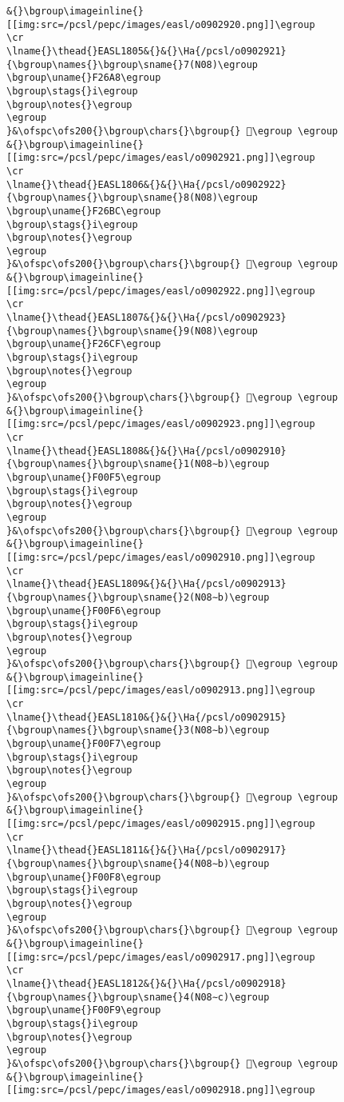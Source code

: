 \begin{verbatim}
&{}\bgroup\imageinline{}[[img:src=/pcsl/pepc/images/easl/o0902920.png]]\egroup
\cr
\lname{}\thead{}EASL1805&{}&{}\Ha{/pcsl/o0902921}{\bgroup\names{}\bgroup\sname{}7(N08)\egroup
\bgroup\uname{}F26A8\egroup
\bgroup\stags{}i\egroup
\bgroup\notes{}\egroup
\egroup
}&\ofspc\ofs200{}\bgroup\chars{}\bgroup{} 󲚨\egroup \egroup
&{}\bgroup\imageinline{}[[img:src=/pcsl/pepc/images/easl/o0902921.png]]\egroup
\cr
\lname{}\thead{}EASL1806&{}&{}\Ha{/pcsl/o0902922}{\bgroup\names{}\bgroup\sname{}8(N08)\egroup
\bgroup\uname{}F26BC\egroup
\bgroup\stags{}i\egroup
\bgroup\notes{}\egroup
\egroup
}&\ofspc\ofs200{}\bgroup\chars{}\bgroup{} 󲚼\egroup \egroup
&{}\bgroup\imageinline{}[[img:src=/pcsl/pepc/images/easl/o0902922.png]]\egroup
\cr
\lname{}\thead{}EASL1807&{}&{}\Ha{/pcsl/o0902923}{\bgroup\names{}\bgroup\sname{}9(N08)\egroup
\bgroup\uname{}F26CF\egroup
\bgroup\stags{}i\egroup
\bgroup\notes{}\egroup
\egroup
}&\ofspc\ofs200{}\bgroup\chars{}\bgroup{} 󲛏\egroup \egroup
&{}\bgroup\imageinline{}[[img:src=/pcsl/pepc/images/easl/o0902923.png]]\egroup
\cr
\lname{}\thead{}EASL1808&{}&{}\Ha{/pcsl/o0902910}{\bgroup\names{}\bgroup\sname{}1(N08∼b)\egroup
\bgroup\uname{}F00F5\egroup
\bgroup\stags{}i\egroup
\bgroup\notes{}\egroup
\egroup
}&\ofspc\ofs200{}\bgroup\chars{}\bgroup{} 󰃵\egroup \egroup
&{}\bgroup\imageinline{}[[img:src=/pcsl/pepc/images/easl/o0902910.png]]\egroup
\cr
\lname{}\thead{}EASL1809&{}&{}\Ha{/pcsl/o0902913}{\bgroup\names{}\bgroup\sname{}2(N08∼b)\egroup
\bgroup\uname{}F00F6\egroup
\bgroup\stags{}i\egroup
\bgroup\notes{}\egroup
\egroup
}&\ofspc\ofs200{}\bgroup\chars{}\bgroup{} 󰃶\egroup \egroup
&{}\bgroup\imageinline{}[[img:src=/pcsl/pepc/images/easl/o0902913.png]]\egroup
\cr
\lname{}\thead{}EASL1810&{}&{}\Ha{/pcsl/o0902915}{\bgroup\names{}\bgroup\sname{}3(N08∼b)\egroup
\bgroup\uname{}F00F7\egroup
\bgroup\stags{}i\egroup
\bgroup\notes{}\egroup
\egroup
}&\ofspc\ofs200{}\bgroup\chars{}\bgroup{} 󰃷\egroup \egroup
&{}\bgroup\imageinline{}[[img:src=/pcsl/pepc/images/easl/o0902915.png]]\egroup
\cr
\lname{}\thead{}EASL1811&{}&{}\Ha{/pcsl/o0902917}{\bgroup\names{}\bgroup\sname{}4(N08∼b)\egroup
\bgroup\uname{}F00F8\egroup
\bgroup\stags{}i\egroup
\bgroup\notes{}\egroup
\egroup
}&\ofspc\ofs200{}\bgroup\chars{}\bgroup{} 󰃸\egroup \egroup
&{}\bgroup\imageinline{}[[img:src=/pcsl/pepc/images/easl/o0902917.png]]\egroup
\cr
\lname{}\thead{}EASL1812&{}&{}\Ha{/pcsl/o0902918}{\bgroup\names{}\bgroup\sname{}4(N08∼c)\egroup
\bgroup\uname{}F00F9\egroup
\bgroup\stags{}i\egroup
\bgroup\notes{}\egroup
\egroup
}&\ofspc\ofs200{}\bgroup\chars{}\bgroup{} 󰃹\egroup \egroup
&{}\bgroup\imageinline{}[[img:src=/pcsl/pepc/images/easl/o0902918.png]]\egroup

\end{verbatim}

